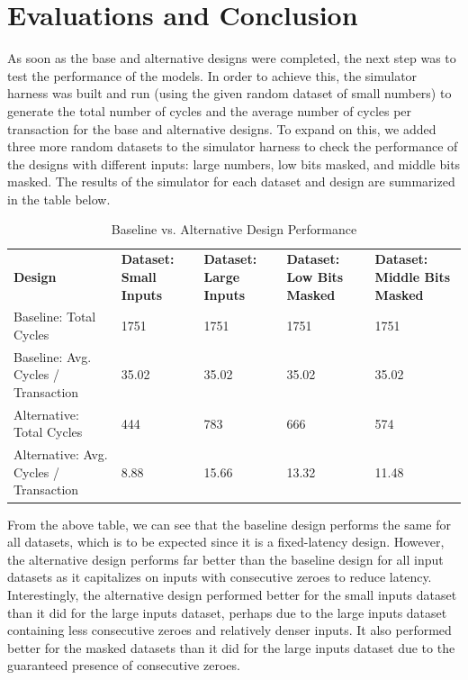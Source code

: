 \documentclass[11pt]{article}
\begin{document}
\section{Evaluations and Conclusion}

As soon as the base and alternative designs were completed, the next step was to test the performance of the models. In order to achieve this, the simulator harness was built and run (using the given random dataset of small numbers) to generate the total number of cycles and the average number of cycles per transaction for the base and alternative designs. To expand on this, we added three more random datasets to the simulator harness to check the performance of the designs with different inputs: large numbers, low bits masked, and middle bits masked. The results of the simulator for each dataset and design are summarized in the table below.

\begin{table}[h]
\begin{tabular} {p{2cm} | p{3cm} | p{3cm} | p{3cm} | p{3cm} }

\hline
\textbf{Design}    & \textbf{Dataset: Small Inputs} & \textbf{Dataset: Large Inputs} & \textbf{Dataset: Low Bits Masked} & \textbf{Dataset: Middle Bits Masked} \\
Baseline: Total Cycles                    & 1751                           & 1751                           & 1751                       & 1751    \\
Baseline: Avg. Cycles / Transaction       & 35.02                          & 35.02                          & 35.02                      & 35.02   \\
Alternative: Total Cycles                 & 444                            & 783                            & 666                        & 574     \\
Alternative: Avg. Cycles / Transaction    & 8.88                           & 15.66                          & 13.32                      & 11.48   \\
\hline                    
\end{tabular}
\caption{Baseline vs. Alternative Design Performance}
\end{table}


From the above table, we can see that the baseline design performs the same for all datasets, which is to be expected since it is a fixed-latency design. However, the alternative design performs far better than the baseline design for all input datasets as it capitalizes on inputs with consecutive zeroes to reduce latency. Interestingly, the alternative design performed better for the small inputs dataset than it did for the large inputs dataset, perhaps due to the large inputs dataset containing less consecutive zeroes and relatively denser inputs. It also performed better for the masked datasets than it did for the large inputs dataset due to the guaranteed presence of consecutive zeroes.
\end{document}
